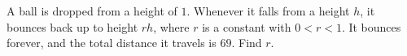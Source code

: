 A ball is dropped from a height of $1$. Whenever it falls from a height $h$, it bounces back up to height $rh$, where $r$ is a constant with $0<r<1$. It bounces forever, and the total distance it travels is $69$. Find $r$.
